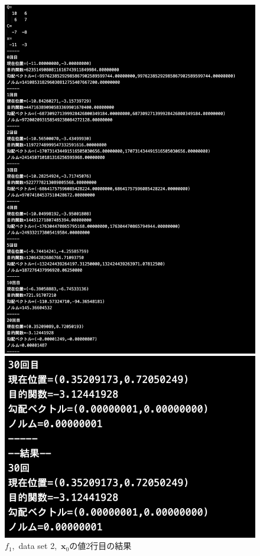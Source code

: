 \documentclass[12pt]{jarticle}
\begin{document}
\clearpage
\begin{figure}[h]
    \begin{center}
        \includegraphics[scale=0.2]{kadai1_1s_out2_2_1.png}
    \end{center}
    \begin{center}
        \includegraphics[scale=0.4]{kadai1_1s_out2_2_2.png}
    \end{center}
    \caption{$f_1$,\ data set 2,\ $\boldsymbol{x}_0$の値2行目の結果}
\end{figure}
\end{document}
